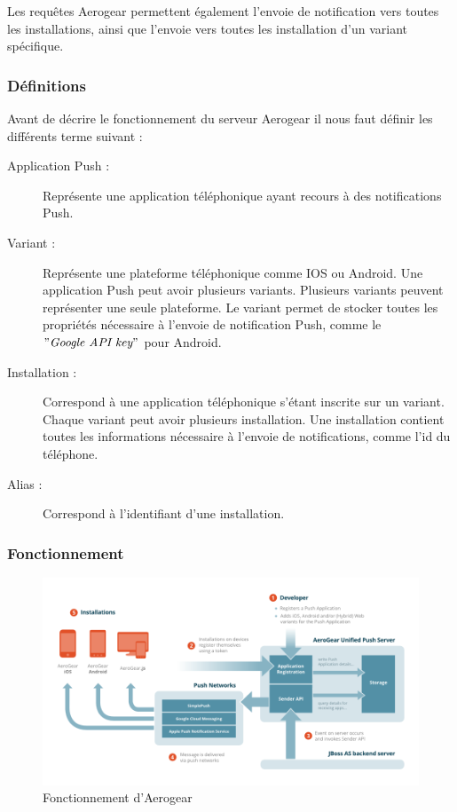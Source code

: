 Les requêtes Aerogear permettent également l'envoie de notification vers toutes les installations, ainsi que l'envoie vers toutes les installation d'un variant spécifique.

\subsubsection{Définitions} 

Avant de décrire le fonctionnement du serveur Aerogear il nous faut définir les différents terme suivant :

\begin{description}
 \item[Application Push :] Représente une application téléphonique ayant recours à des notifications Push.
 \item[Variant :] Représente une plateforme téléphonique comme IOS ou Android. Une application Push peut avoir plusieurs variants. Plusieurs variants peuvent représenter une seule plateforme. Le variant permet de stocker toutes les propriétés nécessaire à l'envoie de notification Push, comme le $"\textit{Google API key}"$ pour Android.
 \item[Installation :] Correspond à une application téléphonique s'étant inscrite sur un variant. Chaque variant peut avoir plusieurs installation. Une installation contient toutes les informations nécessaire à l'envoie de notifications, comme l'id du téléphone.
 \item[Alias :] Correspond à l'identifiant d'une installation.
\end{description}

\subsubsection{Fonctionnement}

\begin{figure}[!h]
	\includegraphics[scale=0.6]{img/aerogear_unified_push_server.png}
	\caption{\label{aerogear} Fonctionnement d'Aerogear}
\end{figure}

